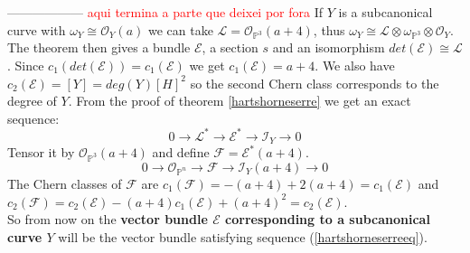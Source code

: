 \documentclass[
	oldfontcommands,
	sumario=abnt-6027-2012,
	12pt,			%
	openright,		%
	oneside,		%
	a4paper,		%
	english,		%
	brazil			%
	]{imecc-unicamp}
\begin{document}
------------------
\textcolor{red}{aqui termina a parte que deixei por fora}
\fi
If $Y$ is a subcanonical curve with $\omega_Y \cong \mathcal{O}_Y(a)$ we can take $\mathcal{L}=\mathcal{O}_{\mathbb{P}^3}(a+4)$, thus $\omega_Y \cong \mathcal{L}\otimes\omega_{\mathbb{P}^3}\otimes \mathcal{O}_Y$. The theorem then gives a bundle $\mathcal{E}$, a section $s$ and an isomorphism $det(\mathcal{E}) \cong \mathcal{L}$. Since $c_1(det(\mathcal{E}))=c_1(\mathcal{E})$ \cite[Hartshorne, p.430]{hartshorne_2010} we get $c_1(\mathcal{E})=a+4$. We also have $c_2(\mathcal{E})=[Y]=deg(Y)[H]^2$  \cite[Hartshorne, C6 p.431]{hartshorne_2010} so the second Chern class corresponds to the degree of $Y$.
From the proof of theorem \ref{hartshorneserre} we get an exact sequence:
\begin{equation}
0 \to \mathcal{L}^* \to \mathcal{E}^* \to \mathcal{I}_Y \to 0
\end{equation}
Tensor it by $\mathcal{O}_{\mathbb{P}^3}(a+4)$ and define $\mathcal{F}=\mathcal{E}^* (a+4)$.
\begin{equation}\label{hartshorneserreeq}
0 \to \mathcal{O}_{\mathbb{P}^n} \to \mathcal{F} \to \mathcal{I}_Y(a+4) \to 0
\end{equation}
The Chern classes of $\mathcal{F}$ are $c_1(\mathcal{F})=-(a+4)+2(a+4)=c_1(\mathcal{E})$ and $c_2(\mathcal{F})=c_2(\mathcal{E})-(a+4)c_1(\mathcal{E})+(a+4)^2=c_2(\mathcal{E})$.\\So from now on the \textbf{vector bundle $\mathcal{E}$ corresponding to a subcanonical curve $Y$} will be the vector bundle satisfying sequence (\ref{hartshorneserreeq}).\\
\end{document}
